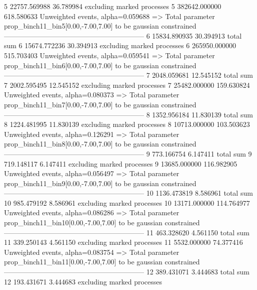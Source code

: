 5          22757.569988    36.789984       excluding marked processes    
5          382642.000000   618.580633      Unweighted events, alpha=0.059688
  => Total parameter prop_binch11_bin5[0.00,-7.00,7.00] to be gaussian constrained
------------------------------------------------------------
6          15834.890935    30.394913       total sum                     
6          15674.772236    30.394913       excluding marked processes    
6          265950.000000   515.703403      Unweighted events, alpha=0.059541
  => Total parameter prop_binch11_bin6[0.00,-7.00,7.00] to be gaussian constrained
------------------------------------------------------------
7          2048.059681     12.545152       total sum                     
7          2002.595495     12.545152       excluding marked processes    
7          25482.000000    159.630824      Unweighted events, alpha=0.080373
  => Total parameter prop_binch11_bin7[0.00,-7.00,7.00] to be gaussian constrained
------------------------------------------------------------
8          1352.956184     11.830139       total sum                     
8          1224.481995     11.830139       excluding marked processes    
8          10713.000000    103.503623      Unweighted events, alpha=0.126291
  => Total parameter prop_binch11_bin8[0.00,-7.00,7.00] to be gaussian constrained
------------------------------------------------------------
9          773.166754      6.147411        total sum                     
9          719.148117      6.147411        excluding marked processes    
9          13685.000000    116.982905      Unweighted events, alpha=0.056497
  => Total parameter prop_binch11_bin9[0.00,-7.00,7.00] to be gaussian constrained
------------------------------------------------------------
10         1136.473819     8.586961        total sum                     
10         985.479192      8.586961        excluding marked processes    
10         13171.000000    114.764977      Unweighted events, alpha=0.086286
  => Total parameter prop_binch11_bin10[0.00,-7.00,7.00] to be gaussian constrained
------------------------------------------------------------
11         463.328620      4.561150        total sum                     
11         339.250143      4.561150        excluding marked processes    
11         5532.000000     74.377416       Unweighted events, alpha=0.083754
  => Total parameter prop_binch11_bin11[0.00,-7.00,7.00] to be gaussian constrained
------------------------------------------------------------
12         389.431071      3.444683        total sum                     
12         193.431671      3.444683        excluding marked processes    
